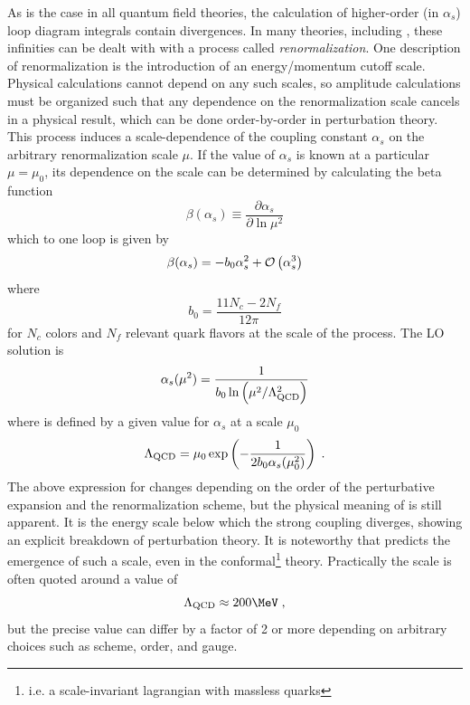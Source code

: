 
As is the case in all quantum field theories, the calculation of higher-order (in $\alpha_s$) loop diagram integrals contain divergences.
In many theories, including \qcd \cite{Gross:1973ju}, these infinities can be dealt with with a process called \emph{renormalization}.
One description of renormalization is the introduction of an energy/momentum cutoff scale.
Physical calculations cannot depend on any such scales, so amplitude calculations must be organized such that any dependence on the renormalization scale cancels in a physical result, which can be done order-by-order in perturbation theory.
This process induces a scale-dependence of the coupling constant $\alpha_s$ on the arbitrary renormalization scale $\mu$.
If the value of $\alpha_s$ is known at a particular $\mu = \mu_0$, its dependence on the scale can be determined by calculating the beta function
\begin{equation}
  \beta(\alpha_s) \equiv  \frac{\partial \alpha_s}{\partial \ln \mu^2}
\end{equation}
which to one loop is given by \cite{Gross:1973id}
\begin{equation}
  \beta(\alpha_s) = -b_0 \alpha_s^2 + \mathcal{O}\left( \alpha_s^3 \right)
\end{equation}
where
\[
b_0 = \frac{11 N_c - 2 N_f}{12\pi}
\]
for $N_c$ colors and $N_f$ relevant quark flavors at the scale of the process.
The \ac{LO} solution is
\begin{equation}
  \alpha_s(\mu^2) = \frac{1}{b_0 \ln\left(\mu^2 / \Lambda_\textrm{QCD}^2\right)}
  \label{eq:running_as}
\end{equation}
where \lqcd is defined by a given value for $\alpha_s$ at a scale $\mu_0$
\[
\Lambda_\textrm{QCD} = \mu_0 \exp \left( -\frac{1}{2 b_0 \alpha_s(\mu_0^2)} \right) \; .
\]
The above expression for \lqcd changes depending on the order of the perturbative expansion and the renormalization scheme, but the physical meaning of \lqcd is still apparent.
It is the energy scale below which the strong coupling diverges, showing an explicit breakdown of perturbation theory.
It is noteworthy that \qcd predicts the emergence of such a scale, even in the conformal\footnote{i.e. a scale-invariant lagrangian with massless quarks} theory.
Practically the \qcd scale is often quoted around a value of %
\[
\lqcd \approx 200 \MeV \;,
\]
but the precise value can differ by a factor of 2 or more depending on arbitrary choices such as scheme, order, and gauge.

